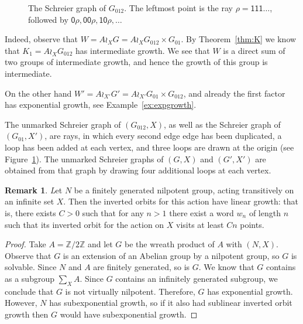 \documentclass{amsart}
\newcommand\Z{\mathbb{Z}}
\newcommand\Grig{{G_{012}}}
\newcommand\Erschler{{G_{01}}}
\theoremstyle{definition}
\newtheorem{remark}[lemma]{Remark}
\begin{document}
\begin{figure}
  \begin{center}
  \end{center}
  \caption{The Schreier graph of $\Grig$. The leftmost point is the ray $\rho=\mathsf{111}\dots$, followed by $\mathsf0\rho,\mathsf{00}\rho,\mathsf{10}\rho,\dots$}\label{fig:schreier}
\end{figure}

Indeed, observe that $W=A\wr_XG = A\wr_X \Grig \times \Erschler$. By
Theorem~\ref{thm:K} we know that $K_1= A\wr_X \Grig$ has intermediate
growth. We see that $W$ is a direct sum of two groups of intermediate
growth, and hence the growth of this group is intermediate.

On the other hand $W'=A\wr_{X'}G' = A\wr_{X'}\Erschler \times \Grig$,
and already the first factor has exponential growth, see
Example~\ref{ex:expgrowth}.

The unmarked Schreier graph of $(\Grig,X)$, as well as the Schreier
graph of $(\Erschler,X')$, are rays, in which every second edge edge
has been duplicated, a loop has been added at each vertex, and three
loops are drawn at the origin (see Figure~\ref{fig:schreier}). The
unmarked Schreier graphs of $(G,X)$ and $(G',X')$ are obtained from
that graph by drawing four additional loops at each vertex.

\begin{remark}\label{rem:nilpotentactions}
  \textit Let $N$ be a finitely generated nilpotent group, acting
  transitively on an infinite set $X$. Then the inverted orbits for
  this action have linear growth: that is, there exists $C>0$ such
  that for any $n>1$ there exist a word $w_n$ of length $n$ such that
  its inverted orbit for the action on $X$ visits at least $Cn$
  points.
\end{remark}
\begin{proof}
  Take $A=\Z/2\Z$ and let $G$ be the wreath product of $A$ with
  $(N,X)$. Observe that $G$ is an extension of an Abelian group by a
  nilpotent group, so $G$ is solvable. Since $N$ and $A$ are finitely
  generated, so is $G$.  We know that $G$ contains as a subgroup
  $\sum_X A$. Since $G$ contains an infinitely generated subgroup, we
  conclude that $G$ is not virtually nilpotent.  Therefore, $G$ has
  exponential growth. However, $N$ has subexponential growth, so if it
  also had sublinear inverted orbit growth then $G$ would have
  subexponential growth.
\end{proof}
\end{document}
